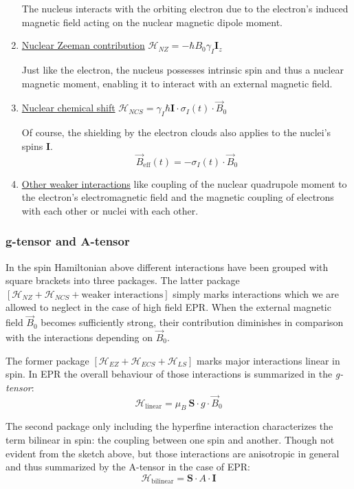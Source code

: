 \documentclass[11.5pt,a4paper]{article}
\begin{document}
\begin{enumerate}
  The nucleus interacts with the orbiting electron due to the electron's induced magnetic field acting on the nuclear magnetic dipole moment. 

  \item \uline{Nuclear Zeeman contribution} $\mathcal{H}_{NZ} = -\hbar B_0 \gamma_I \mathbf{I}_z$
  
  Just like the electron, the nucleus possesses intrinsic spin and thus a nuclear magnetic moment, enabling it to interact with an external magnetic field.

  \item \uline{Nuclear chemical shift} $\mathcal{H}_{NCS} = \gamma_I \hbar \mathbf{I} \cdot \sigma_I(t) \cdot \vec{B}_0$
  
  Of course, the shielding by the electron clouds also applies to the nuclei's spins $\mathbf{I}$.
  \begin{equation}
    \vec{B}_\text{eff}(t) = - \sigma_I(t) \cdot \vec{B}_0
  \end{equation}

  \item \uline{Other weaker interactions} like coupling of the nuclear quadrupole moment to the electron's electromagnetic field and the magnetic coupling of electrons with each other or nuclei with each other.
\end{enumerate}

\subsubsection{g-tensor and A-tensor}
  In the spin Hamiltonian above different interactions have been grouped with square brackets into three packages. The latter package $\left[\mathcal{H}_{NZ} + \mathcal{H}_{NCS} + \text{weaker interactions}\right]$ simply marks interactions which we are allowed to neglect in the case of high field EPR. When the external magnetic field $\vec{B}_0$ becomes sufficiently strong, their contribution diminishes in comparison with the interactions depending on $\vec{B}_0$.

  The former package $\left[\mathcal{H}_{EZ} + \mathcal{H}_{ECS} + \mathcal{H}_{LS}\right]$ marks major interactions linear in spin. In EPR the overall behaviour of those interactions is summarized in the \emph{g-tensor}:
  \begin{equation}
    \mathcal{H}_\text{linear} = \mu_B\ \mathbf{S} \cdot g \cdot \vec{B}_0
  \end{equation}

  The second package only including the hyperfine interaction characterizes the term bilinear in spin: the coupling between one spin and another. Though not evident from the sketch above, but those interactions are anisotropic in general and thus summarized by the A-tensor in the case of EPR:
  \begin{equation}
    \mathcal{H}_\text{bilinear} = \mathbf{S} \cdot A \cdot \mathbf{I}
  \end{equation}
\end{document}

